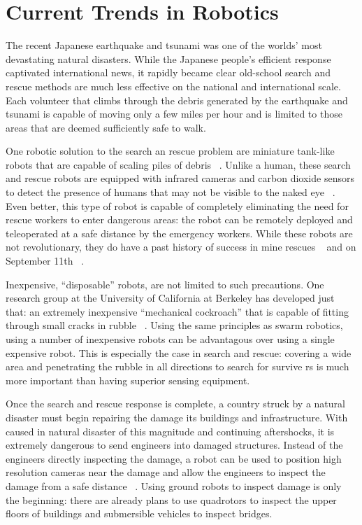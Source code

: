 \documentclass[twocolumn,11pt]{article}
\begin{document}
\section{Current Trends in Robotics}
\label{sec:econ}
The recent Japanese earthquake and tsunami was one of the worlds' most
devastating natural disasters. While the Japanese people's efficient response
captivated international news, it rapidly became clear old-school search and
rescue methods are much less effective on the national and international scale.
Each volunteer that climbs through the debris generated by the earthquake and
tsunami is capable of moving only a few miles per hour and is limited to those
areas that are deemed sufficiently safe to walk.

One robotic solution to the search an rescue problem are miniature tank-like
robots that are capable of scaling piles of debris ~\cite{search}. Unlike a
human, these search and rescue robots are equipped with infrared cameras and
carbon dioxide sensors to detect the presence of humans that may not be visible
to the naked eye ~\cite{search}. Even better, this type of robot is capable of
completely eliminating the need for rescue workers to enter dangerous areas:
the robot can be remotely deployed and teleoperated at a safe distance by the
emergency workers. While these robots are not revolutionary, they do have a
past history of success in mine rescues ~\cite{mine} and on September 11th
~\cite{sept11}.

Inexpensive, ``disposable'' robots, are not limited to such precautions. One
research group at the University of California at Berkeley has developed just
that: an extremely inexpensive ``mechanical cockroach'' that is capable of
fitting through small cracks in rubble ~\cite{cockroach}. Using the same
principles as swarm robotics, using a number of inexpensive robots can be
advantagous over using a single expensive robot. This is especially the case in
search and rescue: covering a wide area and penetrating the rubble in all
directions to search for survive rs is much more important than having superior
sensing equipment.

Once the search and rescue response is complete, a country struck by a natural
disaster must begin repairing the damage its buildings and infrastructure. With
caused in natural disaster of this magnitude and continuing aftershocks, it is
extremely dangerous to send engineers into damaged structures. Instead of the
engineers directly inspecting the damage, a robot can be used to position high
resolution cameras near the damage and allow the engineers to inspect the
damage from a safe distance ~\cite{gym}. Using ground robots to inspect damage
is only the beginning: there are already plans to use quadrotors to inspect
the upper floors of buildings and submersible vehicles to inspect bridges.
\end{document}
